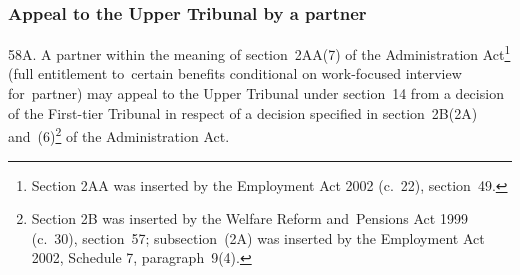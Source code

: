 \documentclass[12pt,a4paper]{article}
\begin{document}
%
%
%
%
%
%

\subsubsection[58A. Appeal to 
the Upper Tribunal  %
by a partner]{Appeal to 
the Upper Tribunal  %
by a partner}

58A.  A partner within the meaning of section~2AA(7) of the Administration Act\footnote{Section 2AA was inserted by the Employment Act 2002 (c.\ 22), section~49.} (full entitlement to~certain benefits conditional on work-focused interview for~partner) may appeal to 
the Upper Tribunal  %
under section~14 from a decision of 
the First-tier Tribunal  %
in respect of a decision specified in section~2B(2A) and~(6)\footnote{Section 2B was inserted by the Welfare Reform and~Pensions Act 1999 (c.\ 30), section~57; subsection~(2A) was inserted by the Employment Act 2002, Schedule 7, paragraph~9(4).} of the Administration Act.
\end{document}
